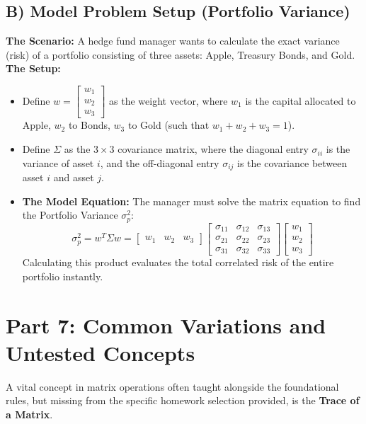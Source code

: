 \documentclass{article}
\begin{document}
\subsection*{B) Model Problem Setup (Portfolio Variance)}
\textbf{The Scenario:} A hedge fund manager wants to calculate the exact variance (risk) of a portfolio consisting of three assets: Apple, Treasury Bonds, and Gold. 
\textbf{The Setup:}
\begin{itemize}
    \item Define $w = \begin{bmatrix} w_1 \\ w_2 \\ w_3 \end{bmatrix}$ as the weight vector, where $w_1$ is the capital allocated to Apple, $w_2$ to Bonds, $w_3$ to Gold (such that $w_1 + w_2 + w_3 = 1$).
    \item Define $\Sigma$ as the $3 \times 3$ covariance matrix, where the diagonal entry $\sigma_{ii}$ is the variance of asset $i$, and the off-diagonal entry $\sigma_{ij}$ is the covariance between asset $i$ and asset $j$.
    \item \textbf{The Model Equation:} The manager must solve the matrix equation to find the Portfolio Variance $\sigma_p^2$: 
    \[ \sigma_p^2 = w^T \Sigma w = \begin{bmatrix} w_1 & w_2 & w_3 \end{bmatrix} \begin{bmatrix} \sigma_{11} & \sigma_{12} & \sigma_{13} \\ \sigma_{21} & \sigma_{22} & \sigma_{23} \\ \sigma_{31} & \sigma_{32} & \sigma_{33} \end{bmatrix} \begin{bmatrix} w_1 \\ w_2 \\ w_3 \end{bmatrix} \]
    Calculating this product evaluates the total correlated risk of the entire portfolio instantly.
\end{itemize}

\section*{Part 7: Common Variations and Untested Concepts}

A vital concept in matrix operations often taught alongside the foundational rules, but missing from the specific homework selection provided, is the \textbf{Trace of a Matrix}.
\end{document}
